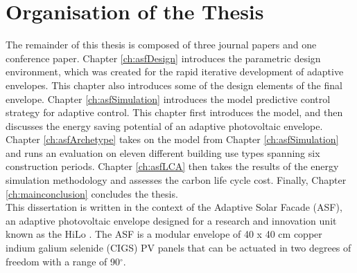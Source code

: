 



\newpage



\section{Organisation of the Thesis}

The remainder of this thesis is composed of three journal papers and one conference paper. Chapter \ref{ch:asfDesign} introduces the parametric design environment, which was created for the rapid iterative development of adaptive envelopes. This chapter also introduces some of the design elements of the final envelope. Chapter \ref{ch:asfSimulation} introduces the model predictive control strategy for adaptive control. This chapter first introduces the model, and then discusses the energy saving potential of an adaptive photovoltaic envelope. Chapter \ref{ch:asfArchetype} takes on the model from Chapter \ref{ch:asfSimulation} and runs an evaluation on eleven different building use types spanning six construction periods. Chapter \ref{ch:asfLCA} then takes the results of the energy simulation methodology and assesses the carbon life cycle cost. Finally, Chapter \ref{ch:mainconclusion} concludes the thesis. \\

This dissertation is written in the context of the Adaptive Solar Facade (ASF), an adaptive photovoltaic envelope designed for a research and innovation unit known as the HiLo \cite{Block2017}. The ASF is a modular envelope of 40 x 40 cm copper indium galium selenide (CIGS) PV panels that can be actuated in two degrees of freedom with a range of 90$^{\circ}$. 